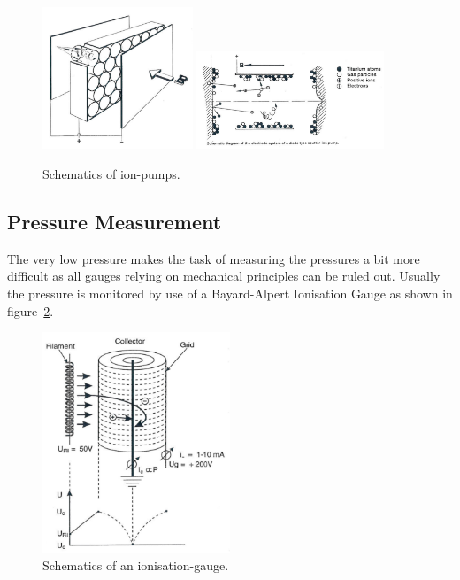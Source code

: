 \begin{figure}[htbp]
\centering
\includegraphics[width=0.4\textwidth]{figures/02_03a}
\includegraphics[width=0.5\textwidth]{figures/02_03b}
\caption{Schematics of ion-pumps.}
\label{fig:ion_pump}
\end{figure}

\subsection{Pressure Measurement}
The very low pressure makes the task of measuring the pressures a bit more difficult as all gauges relying on mechanical principles can be ruled out. Usually the pressure is monitored by use of a Bayard-Alpert Ionisation Gauge as shown in figure~\ref{fig:ion_gauge}.

\begin{figure}[htbp]
\centering
\includegraphics[width=0.5\textwidth]{figures/02_04}
\caption{Schematics of an ionisation-gauge.}
\label{fig:ion_gauge}
\end{figure}

